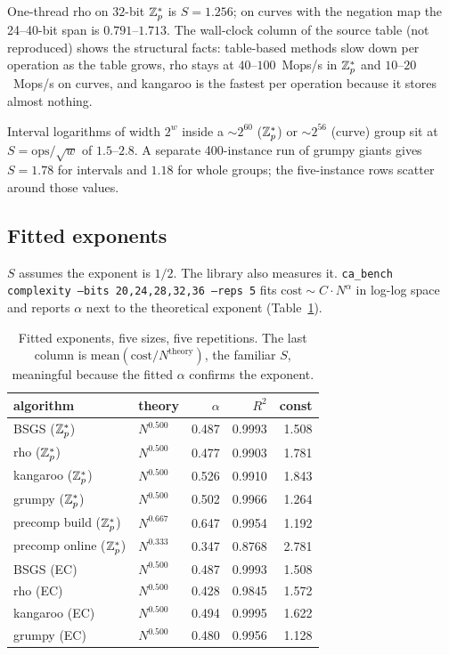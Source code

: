One-thread rho on $32$-bit $\mathbb{Z}_p^*$ is $S=1.256$; on curves with the
negation map the 24--40-bit span is $0.791$--$1.713$. The wall-clock
column of the source table (not reproduced) shows the structural
facts: table-based methods slow down per operation as the table grows,
rho stays at $40$--$100$~Mops/s in $\mathbb{Z}_p^*$ and $10$--$20$~Mops/s on
curves, and kangaroo is the fastest per operation because it stores
almost nothing.

Interval logarithms of width $2^w$ inside a $\sim 2^{60}$ ($\mathbb{Z}_p^*$)
or $\sim 2^{56}$ (curve) group sit at $S=\mathrm{ops}/\sqrt{w}$ of
$1.5$--$2.8$. A separate 400-instance run of grumpy giants gives
$S=1.78$ for intervals and $1.18$ for whole groups; the five-instance
rows scatter around those
values.

\subsection{Fitted exponents}

$S$ assumes the exponent is $1/2$. The library also measures it.
\texttt{ca\_bench complexity --bits 20,24,28,32,36 --reps 5} fits
$\mathrm{cost}\sim C\cdot N^{\alpha}$ in log-log space and reports
$\alpha$ next to the theoretical exponent
(Table~\ref{tab:exponents}).

\begin{table}[t]
\centering
\small
\caption{Fitted exponents, five sizes, five repetitions. The last
  column is $\mathrm{mean}(\mathrm{cost}/N^{\mathrm{theory}})$, the
  familiar $S$, meaningful because the fitted $\alpha$ confirms the
  exponent.}
\label{tab:exponents}
\begin{tabular}{@{}llrrr@{}}
\toprule
algorithm & theory & $\alpha$ & $R^2$ & const \\
\midrule
BSGS ($\mathbb{Z}_p^*$) & $N^{0.500}$ & 0.487 & 0.9993 & 1.508 \\
rho ($\mathbb{Z}_p^*$) & $N^{0.500}$ & 0.477 & 0.9903 & 1.781 \\
kangaroo ($\mathbb{Z}_p^*$) & $N^{0.500}$ & 0.526 & 0.9910 & 1.843 \\
grumpy ($\mathbb{Z}_p^*$) & $N^{0.500}$ & 0.502 & 0.9966 & 1.264 \\
precomp build ($\mathbb{Z}_p^*$) & $N^{0.667}$ & 0.647 & 0.9954 & 1.192 \\
precomp online ($\mathbb{Z}_p^*$) & $N^{0.333}$ & 0.347 & 0.8768 & 2.781 \\
BSGS (EC) & $N^{0.500}$ & 0.487 & 0.9993 & 1.508 \\
rho (EC) & $N^{0.500}$ & 0.428 & 0.9845 & 1.572 \\
kangaroo (EC) & $N^{0.500}$ & 0.494 & 0.9995 & 1.622 \\
grumpy (EC) & $N^{0.500}$ & 0.480 & 0.9956 & 1.128 \\
\bottomrule
\end{tabular}
\end{table}

